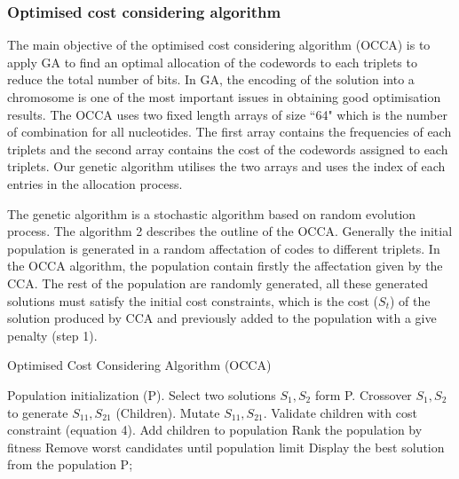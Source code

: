 \documentclass{singlecol-new}
\theoremstyle{TH}{
\newtheorem{lemma}{Lemma}
\newtheorem{theorem}[lemma]{Theorem}
\newtheorem{corrolary}[lemma]{Corrolary}
\newtheorem{conjecture}[lemma]{Conjecture}
\newtheorem{proposition}[lemma]{Proposition}
\newtheorem{claim}[lemma]{Claim}
\newtheorem{stheorem}[lemma]{Wrong Theorem}
}
\theoremstyle{THrm}{
\newtheorem{definition}{Definition}
\newtheorem{question}{Question}
\newtheorem{remark}{Remark}
\newtheorem{scheme}{Scheme}
}
\theoremstyle{THhit}{
\newtheorem{case}{Case}[section]
}
\begin{document}
\subsubsection{Optimised cost considering algorithm}
The main objective of the optimised cost considering algorithm (OCCA) is to apply GA to find an optimal allocation of the codewords to each triplets to reduce the total number of bits. In GA, the encoding of the solution into a chromosome is one of the most important issues in obtaining good optimisation results. The OCCA uses two fixed length arrays of size ``64" which is the number of combination for all nucleotides. The first array contains the frequencies of each triplets and the second array contains the cost of the codewords assigned to each triplets. Our genetic algorithm utilises the two arrays and uses the index of each entries in the allocation process.

The genetic algorithm is a stochastic algorithm based on random evolution process. The algorithm 2 describes the outline of the OCCA.   Generally the initial population is generated in a random affectation of codes to different triplets. In the OCCA algorithm, the population contain firstly the affectation given by the CCA. The rest of the population are randomly generated, all these generated solutions must satisfy the initial cost constraints, which is the cost ($S_t$) of the solution produced by CCA  and previously added to the population with a give penalty (step 1). 

\begin{algorithm}[!thpb]
\caption{Optimised Cost Considering Algorithm (OCCA)}
\begin{algorithmic}[1]
\State Population initialization (P).
\REPEAT  
\State Select two solutions $S_{1},S_{2}$ form P.
\State Crossover $S_{1},S_{2}$ to generate $S_{11},S_{21}$ (Children).
\State Mutate $S_{11},S_{21}$.
\State Validate children with cost constraint (equation 4). 
\State Add children to population
\State Rank the population by fitness
\State Remove worst candidates until population limit
\EndWhile
\State Display the best solution from the population P;
\end{algorithmic}
\end{algorithm}
\end{document}
